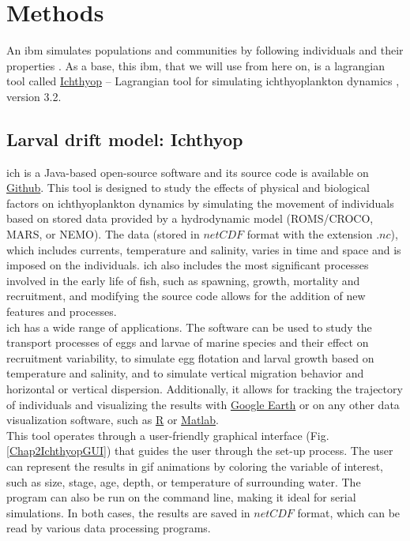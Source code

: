 \clearpage
\section{Methods}\label{Chap2Meth}

An \acrfull{ibm} simulates populations and communities by following individuals and their properties \citep{DeanGrim2014}. As a base, this \acrshort{ibm}, that we will use from here on, is a lagrangian tool called \href{https://ichthyop.org/}{Ichthyop} – Lagrangian tool for simulating ichthyoplankton dynamics \citep{LettVerl2008}, version 3.2.\\

\subsection{Larval drift model: Ichthyop}

\gls{ich} is a Java-based open-source software and its source code is available on \href{https://github.com/ichthyop/ichthyop}{Github}. This tool is designed to study the effects of physical and biological factors on ichthyoplankton dynamics by simulating the movement of individuals based on stored data provided by a hydrodynamic model (ROMS/CROCO, MARS, or NEMO). The data (stored in $netCDF$ format with the extension $.nc$), which includes currents, temperature and salinity, varies in time and space and is imposed on the individuals. \gls{ich} also includes the most significant processes involved in the early life of fish, such as spawning, growth, mortality and recruitment, and modifying the source code allows for the addition of new features and processes.\\

\gls{ich} has a wide range of applications. The software can be used to study the transport processes of eggs and larvae of marine species and their effect on recruitment variability, to simulate egg flotation and larval growth based on temperature and salinity, and to simulate vertical migration behavior and horizontal or vertical dispersion. Additionally, it allows for tracking the trajectory of individuals and visualizing the results with \href{https://earth.google.com/web/}{Google Earth} or on any other data visualization software, such as \href{https://www.r-project.org/}{R} or \href{https://mathworks.com/products/matlab.html}{Matlab}.\\

This tool operates through a user-friendly graphical interface (Fig. \ref{Chap2IchthyopGUI}) that guides the user through the set-up process. The user can represent the results in gif animations by coloring the variable of interest, such as size, stage, age, depth, or temperature of surrounding water. The program can also be run on the command line, making it ideal for serial simulations. In both cases, the results are saved in $netCDF$ format, which can be read by various data processing programs.\\

